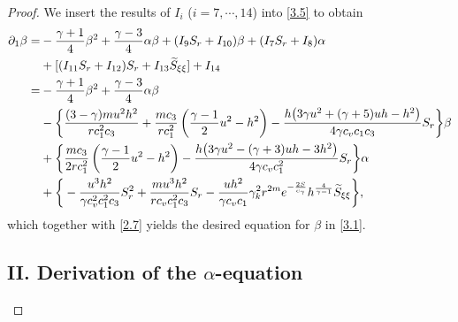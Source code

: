 \documentclass[10pt,a4paper]{amsart}
\begin{document}
\begin{proof}
We insert the results of $I_i$ ($i=7,\cdots,14$) into \eqref{3.5} to obtain
\begin{align*}
\partial_1\beta
=& -\frac{\gamma+1}{4}\beta^{2}
+ \frac{\gamma-3}{4}\alpha\beta +(I_{9} S_{r} +I_{10})\beta +(I_{7} S_{r}+I_{8})\alpha \notag \\
&+[(I_{11} S_{r} +I_{12})S_r +I_{13} \widetilde{S}_{\xi\xi}] +I_{14} \\
=& -\frac{\gamma+1}{4}\beta^{2}
+ \frac{\gamma-3}{4}\alpha\beta \\
&-\bigg\{ \frac{(3-\gamma) m u^2 h^2}{r c_1^2 c_3}+ \frac{m c_3}{r c_1^2}\left( \frac{\gamma-1}{2}u^{2} - h^{2} \right)
 -\frac{h\big(3\gamma u^2 + (\gamma+5)u h - h^2\big)}{4\gamma c_v c_1 c_3} S_r\bigg\}\beta \\
&+\bigg\{ \frac{mc_3}{2r c_1^2} \left( \frac{\gamma-1}{2}u^{2} - h^{2} \right)
 -\frac{h\big( 3\gamma u^2-(\gamma+3)u h-3h^2  \big)}{4\gamma c_v c_1^2 } S_r \bigg\}\alpha \\
&+\bigg\{-\frac{u^3 h^2}{\gamma c_v^2 c_1^{2} c_3}S_r^2
+ \frac{mu^3 h^2 }{r c_v c_1^2 c_3} S_r
-\frac{u h^2}{\gamma c_v c_1}\gamma_k^2 r^{2m} e^{-\frac{2S}{c_\gamma}} h^{\frac{4}{\gamma-1}} \widetilde{S}_{\xi\xi}\bigg\},
\end{align*}
which together with \eqref{2.7} yields the desired equation for $\beta$ in \eqref{3.1}.



\subsection*{II. Derivation of the $\alpha$-equation}


\end{proof}
\end{document}
